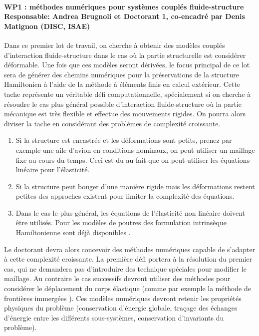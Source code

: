 \documentclass[12pt, french]{article}
\begin{document}
\paragraph{\large WP1 : méthodes numériques pour systèmes couplés fluide-structure\\
Responsable: Andrea Brugnoli et Doctorant 1, co-encadré par Denis Matignon (DISC, ISAE)\\}
 Dans ce premier lot de travail, on cherche à obtenir des modèles couplés d'interaction fluide-structure dans le cas où la partie structurelle est considérer déformable. Une fois que ces modèles seront dérivées, le focus principal de ce lot sera de générer des chemins numériques pour la préservations de la structure Hamiltonien à l'aide de la méthode à éléments finis en calcul extérieur. Cette tache représente un véritable défi computationnelle, spécialement si on cherche à résoudre le cas plus général possible d'interaction fluide-structure où la partie mécanique est très flexible et effectue des mouvements rigides. On pourra alors diviser la tache en considérant des problèmes de complexité croissante. 
\begin{enumerate}
	\item Si la structure est encastrée et les déformations sont petits, prenez par exemple une aile d'avion en conditions nominaux, on peut utiliser un maillage fixe au cours du temps. Ceci est du au fait que on peut utiliser les équations linéaire pour l'élasticité. 
	\item Si la structure peut bouger d'une manière rigide mais les déformations restent petites des approches existent pour limiter la complexité des équations.
	\item Dans le cas le plus général, les équations de l'élasticité non linéaire doivent être utilisés. Pour les modèles de poutres des formulation intrinsèque Hamiltonienne sont déjà disponibles \cite{hodges2003exact}.
\end{enumerate}
Le doctorant devra alors concevoir des méthodes numériques capable de s'adapter à cette complexité croissante. La première défi portera à la résolution du premier cas, qui ne demandera pas d'introduire des technique spéciales pour modifier le maillage. Au contraire le cas successifs devront utiliser des méthodes pour considérer le déplacement du corps élastique (comme par exemple la méthode de frontières immergées \cite{peskin2002}). Ces modèles numériques devront retenir les propriétés physiques du problème (conservation d'énergie globale, traçage des échanges d'énergie entre les différents sous-systèmes, conservation d'invariants du problème).
\end{document}
